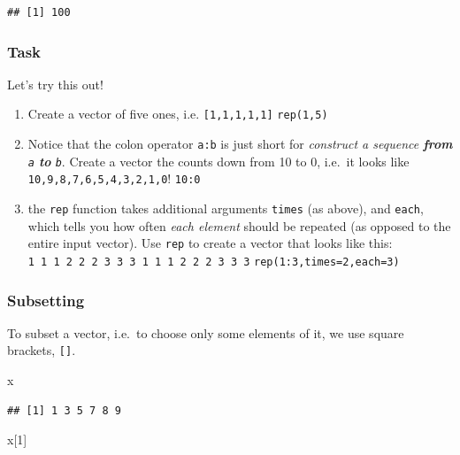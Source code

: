 \documentclass[]{book}
\newenvironment{Shaded}{\begin{snugshade}}{\end{snugshade}}
\newcommand{\DecValTok}[1]{\textcolor[rgb]{0.00,0.00,0.81}{#1}}
\newcommand{\NormalTok}[1]{#1}
\providecommand{\tightlist}{%
  \setlength{\itemsep}{0pt}\setlength{\parskip}{0pt}}
\theoremstyle{definition}
\theoremstyle{definition}
\theoremstyle{definition}
\theoremstyle{remark}
\begin{document}
\begin{verbatim}
## [1] 100
\end{verbatim}

\subsubsection{Task}\label{task}

Let's try this out!

\begin{enumerate}
\def\labelenumi{\arabic{enumi}.}
\tightlist
\item
  Create a vector of five ones, i.e. \texttt{{[}1,1,1,1,1{]}}
  \texttt{rep(1,5)}
\item
  Notice that the colon operator \texttt{a:b} is just short for
  \emph{construct a sequence \textbf{from} \texttt{a} \textbf{to}
  \texttt{b}}. Create a vector the counts down from 10 to 0, i.e.~it
  looks like \texttt{10,9,8,7,6,5,4,3,2,1,0}! \texttt{10:0}
\item
  the \texttt{rep} function takes additional arguments \texttt{times}
  (as above), and \texttt{each}, which tells you how often \emph{each
  element} should be repeated (as opposed to the entire input vector).
  Use \texttt{rep} to create a vector that looks like this:
  \texttt{1\ 1\ 1\ 2\ 2\ 2\ 3\ 3\ 3\ 1\ 1\ 1\ 2\ 2\ 2\ 3\ 3\ 3}
  \texttt{rep(1:3,times=2,each=3)}
\end{enumerate}

\subsubsection{Subsetting}\label{subsetting}

To subset a vector, i.e.~to choose only some elements of it, we use
square brackets, \texttt{{[}{]}}.

\begin{Shaded}
\begin{Highlighting}[]
\NormalTok{x}
\end{Highlighting}
\end{Shaded}

\begin{verbatim}
## [1] 1 3 5 7 8 9
\end{verbatim}

\begin{Shaded}
\begin{Highlighting}[]
\NormalTok{x[}\DecValTok{1}\NormalTok{]}
\end{Highlighting}
\end{Shaded}
\end{document}
